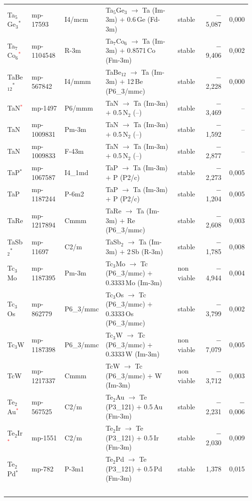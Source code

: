 \begin{longtable}{@{}ll l@{\hspace{4pt}} p{4.6cm} l@{\hspace{4pt}} rr@{}}
Ta$_{5}$Ge$_{3}$$^*$ & mp-17593 & I4/mcm & Ta$_{5}$Ge$_{3}$ $\to$ Ta (Im-3m) $+$ 0.6\,Ge (Fd-3m) & stable & $-$5{,}087 & 0{,}000 \\
Ta$_{7}$Co$_{6}$\textcolor{red}{$^*$} & mp-1104548 & R-3m & Ta$_{7}$Co$_{6}$ $\to$ Ta (Im-3m) $+$ 0.8571\,Co (Fm-3m) & stable & $-$9{,}406 & 0{,}002 \\
TaBe$_{12}$$^*$ & mp-567842 & I4/mmm & TaBe$_{12}$ $\to$ Ta (Im-3m) $+$ 12\,Be (P6\_3/mmc) & stable & $-$2{,}228 & 0{,}000 \\
TaN\textcolor{red}{$^*$} & mp-1497 & P6/mmm & TaN $\to$ Ta (Im-3m) $+$ 0.5\,N$_{2}$ (--) & stable & $-$3{,}469 & -- \\
TaN & mp-1009831 & Pm-3m & TaN $\to$ Ta (Im-3m) $+$ 0.5\,N$_{2}$ (--) & stable & $-$1{,}592 & -- \\
TaN & mp-1009833 & F-43m & TaN $\to$ Ta (Im-3m) $+$ 0.5\,N$_{2}$ (--) & stable & $-$2{,}877 & -- \\
TaP$^*$ & mp-1067587 & I4\_1md & TaP $\to$ Ta (Im-3m) $+$ P (P2/c) & stable & $-$2{,}273 & 0{,}005 \\
TaP & mp-1187244 & P-6m2 & TaP $\to$ Ta (Im-3m) $+$ P (P2/c) & stable & $-$1{,}204 & 0{,}005 \\
TaRe & mp-1217894 & Cmmm & TaRe $\to$ Ta (Im-3m) $+$ Re (P6\_3/mmc) & stable & $-$2{,}608 & 0{,}003 \\
TaSb$_{2}$$^*$ & mp-11697 & C2/m & TaSb$_{2}$ $\to$ Ta (Im-3m) $+$ 2\,Sb (R-3m) & stable & $-$1{,}785 & 0{,}008 \\
Tc$_{3}$Mo & mp-1187395 & Pm-3m & Tc$_{3}$Mo $\to$ Tc (P6\_3/mmc) $+$ 0.3333\,Mo (Im-3m) & non viable & $-$4{,}944 & 0{,}004 \\
Tc$_{3}$Os & mp-862779 & P6\_3/mmc & Tc$_{3}$Os $\to$ Tc (P6\_3/mmc) $+$ 0.3333\,Os (P6\_3/mmc) & stable & $-$3{,}799 & 0{,}002 \\
Tc$_{3}$W & mp-1187398 & P6\_3/mmc & Tc$_{3}$W $\to$ Tc (P6\_3/mmc) $+$ 0.3333\,W (Im-3m) & non viable & $-$7{,}079 & 0{,}005 \\
TcW & mp-1217337 & Cmmm & TcW $\to$ Tc (P6\_3/mmc) $+$ W (Im-3m) & non viable & $-$3{,}712 & 0{,}003 \\
Te$_{2}$Au\textcolor{red}{$^*$} & mp-567525 & C2/m & Te$_{2}$Au $\to$ Te (P3\_121) $+$ 0.5\,Au (Fm-3m) & stable & $-$2{,}231 & $-$0{,}006 \\
Te$_{2}$Ir\textcolor{red}{$^*$} & mp-1551 & C2/m & Te$_{2}$Ir $\to$ Te (P3\_121) $+$ 0.5\,Ir (Fm-3m) & stable & $-$2{,}030 & 0{,}009 \\
Te$_{2}$Pd$^*$ & mp-782 & P-3m1 & Te$_{2}$Pd $\to$ Te (P3\_121) $+$ 0.5\,Pd (Fm-3m) & stable & 1{,}378 & 0{,}015 \\
$$
\end{longtable}
